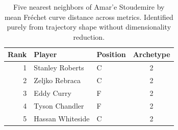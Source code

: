 \begin{table}[htbp]
  \centering\small
  \begin{tabular}{rllc}
    \toprule
    Rank & Player & Position & Archetype \\
    \midrule
    1 & Stanley Roberts & C & 2 \\
    2 & Zeljko Rebraca & C & 2 \\
    3 & Eddy Curry & F & 2 \\
    4 & Tyson Chandler & F & 2 \\
    5 & Hassan Whiteside & C & 2 \\
    \bottomrule
  \end{tabular}
  \caption{Five nearest neighbors of Amar'e Stoudemire by mean Fr\'{e}chet curve distance across metrics. Identified purely from trajectory shape without dimensionality reduction.}
  \label{tab:Amar_e_Stoudemire_frechet_curve_neighbors}
\end{table}


